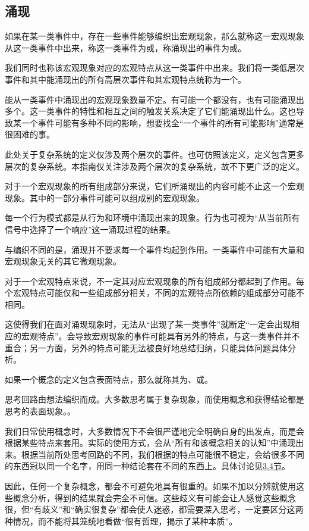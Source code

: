 \subsection{涌现}
如果在某一类事件中，存在一些事件能够编织出宏观现象，那么就称这一宏观现象从这一类事件中出来，称这一类事件为或，称涌现出的事件为或。

我们同时也称该宏观现象对应的宏观特点从这一类事件中出来。我们将一类低层次事件和其中能涌现出的所有高层次事件和其宏观特点统称为一个。
\begin{explain}
能从一类事件中涌现出的宏观现象数量不定。有可能一个都没有，也有可能涌现出多个。这一类事件的特性和相互之间的触发关系决定了它们能涌现出什么。这也导致某一个事件可能有多种不同的影响，想要找全“一个事件的所有可能影响”通常是很困难的事。

此处关于复杂系统的定义仅涉及两个层次的事件。也可仿照该定义，定义包含更多层次的复杂系统。本指南仅关注涉及两个层次的复杂系统，故不下更广泛的定义。

对于一个宏观现象的所有组成部分来说，它们所涌现出的内容可能不止这一个宏观现象。其中的一部分事件可能可以组成别的宏观现象。

每一个行为模式都是从行为和环境中涌现出来的现象。行为也可视为“从当前所有信号中选择了一个响应”这一涌现过程的结果。
\end{explain}
与编织不同的是，涌现并不要求每一个事件均起到作用。一类事件中可能有大量和宏观现象无关的其它微观现象。
\begin{explain}
对于一个宏观特点来说，不一定其对应宏观现象的所有组成部分都起到了作用。每个宏观特点可能仅和一些组成部分相关，不同的宏观特点所依赖的组成部分可能不相同。

这使得我们在面对涌现现象时，无法从“出现了某一类事件”就断定“一定会出现相应的宏观特点”。会导致宏观现象的事件可能具有另外的特点，与这一类事件并不重合；另一方面，另外的特点可能无法被良好地总结归纳，只能具体问题具体分析。
\end{explain}
如果一个概念的定义包含表面特点，那么就称其为、或。
\begin{explain}
思考回路由想法编织而成。大多数思考属于复杂现象，而使用概念和获得结论都是思考的表面现象。。

我们日常使用概念时，大多数情况下不会很严谨地完全明确自身的出发点，而是会根据某些特点来套用。实际的使用方式，会从“所有和该概念相关的认知”中涌现出来。根据当前所处思考回路的不同，我们根据的特点可能很不稳定，会给很多不同的东西冠以同一个名字，用同一种结论套在不同的东西上。具体讨论见\hyperref[sec:人的意识演化基本模型]{3.4节}。

因此，任何一个复杂概念，都会不可避免地具有很重的。如果不加以分辨就使用这些概念分析，得到的结果就会完全不可信。这些歧义有可能会让人感觉这些概念很，但“有歧义”和“确实很复杂”都会使人迷惑，都需要深入思考，一定要区分这两种情况，而不能将其笼统地看做“很有哲理，揭示了某种本质”。
\end{explain}

